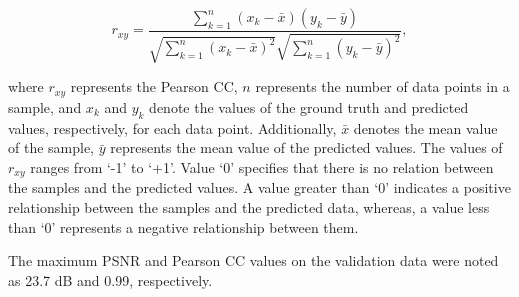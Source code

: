 \begin{equation}
	r_{x 
		y}=\frac{\sum_{k=1}^n\left(x_k-\bar{x}\right)\left(y_k-\bar{y}\right)}{\sqrt{\sum_{k=1}^n\left(x_k-\bar{x}\right)^2}
		\sqrt{\sum_{k=1}^n\left(y_k-\bar{y}\right)^2}},
	\label{eqn:pearsoncc}
\end{equation}

where $r_{xy}$ represents the Pearson CC, \(n\) represents the number of data points in a sample, and $x_k$ and $y_k$ denote the values of the ground truth and predicted values, respectively, for each data point. 
Additionally, $\bar{x}$ denotes the mean value of the sample, $\bar{y}$ represents the mean value of the predicted values. 
The values of $r_{xy}$ ranges from ‘-1’ to ‘+1’. 
Value ‘0’ specifies that there is no relation between the samples and the predicted values. 
A value greater than ‘0’ indicates a positive relationship between the samples and the predicted data, whereas, a value less than ‘0’ represents a negative relationship between them.

The maximum PSNR and Pearson CC values on the validation data were noted as 23.7 dB and 0.99, respectively.
